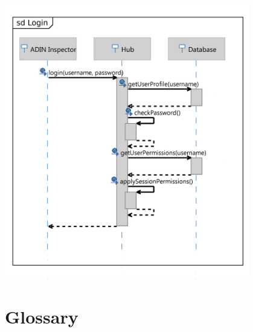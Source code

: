 \documentclass[twoside, english, draft]{Pflichtenheft}
\begin{document}
\begin{center}
\includegraphics[width=0.8\textwidth]{Images/adin-login-seq.png}
\label{fig:adin-login-seq}
\end{center}

\section{Glossary}
\printglossary[title=,toctitle=]



\printbibliography[heading=bibintoc]
\end{document}
